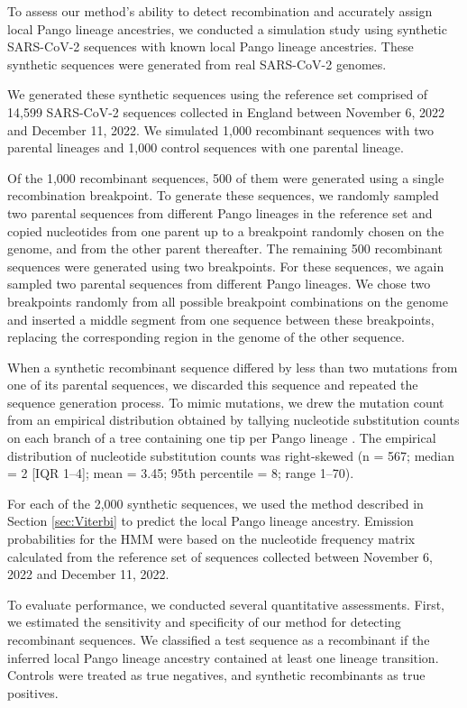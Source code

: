 \documentclass[11pt,oneside,letterpaper]{article}
\begin{document}

To assess our method’s ability to detect recombination and accurately assign local Pango lineage ancestries, we conducted a simulation study using synthetic SARS-CoV-2 sequences with known local Pango lineage ancestries. These synthetic sequences were generated from real SARS-CoV-2 genomes.

We generated these synthetic sequences using the reference set comprised of 14,599 SARS-CoV-2 sequences collected in England between November 6, 2022 and December 11, 2022. We simulated 1,000 recombinant sequences with two parental lineages and 1,000 control sequences with one parental lineage. 

Of the 1,000 recombinant sequences, 500 of them were generated using a single recombination breakpoint. To generate these sequences, we randomly sampled two parental sequences from different Pango lineages in the reference set and copied nucleotides from one parent up to a breakpoint randomly chosen on the genome, and from the other parent thereafter. The remaining 500 recombinant sequences were generated using two breakpoints. For these sequences, we again sampled two parental sequences from different Pango lineages. We chose two breakpoints randomly from all possible breakpoint combinations on the genome and inserted a middle segment from one sequence between these breakpoints, replacing the corresponding region in the genome of the other sequence. 

When a synthetic recombinant sequence differed by less than two mutations from one of its parental sequences, we discarded this sequence and repeated the sequence generation process. To mimic mutations, we drew the mutation count from an empirical distribution obtained by tallying nucleotide substitution counts on each branch of a tree containing one tip per Pango lineage \cite{hadfield_nextstrain_2018}. The empirical distribution of nucleotide substitution counts was right-skewed (n = 567; median = 2 [IQR 1–4]; mean = 3.45; 95th percentile = 8; range 1–70).

For each of the 2,000 synthetic sequences, we used the method described in Section \ref{sec:Viterbi} to predict the local Pango lineage ancestry. Emission probabilities for the HMM were based on the nucleotide frequency matrix calculated from the reference set of sequences collected between November 6, 2022 and December 11, 2022.

To evaluate performance, we conducted several quantitative assessments. First, we estimated the sensitivity and specificity of our method for detecting recombinant sequences. We classified a test sequence as a recombinant if the inferred local Pango lineage ancestry contained at least one lineage transition. Controls were treated as true negatives, and synthetic recombinants as true positives. 
\end{document}
